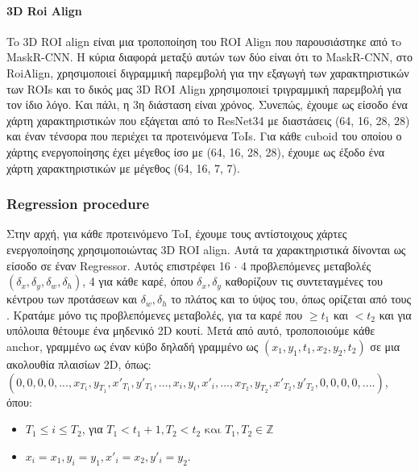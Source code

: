 \paragraph{3D Roi Align}
\en To  \en 3D ROI align \gr είναι μια τροποποίηση του \en ROI Align \gr που παρουσιάστηκε από τo \en MaskR-CNN\gr. Η κύρια διαφορά μεταξύ αυτών των δύο είναι ότι το
\en MaskR-CNN\gr, στο \en RoiAlign\gr,  χρησιμοποιεί διγραμμική παρεμβολή για την εξαγωγή των χαρακτηριστικών των \en ROIs \gr και το δικός μας \en 3D ROI Align \gr χρησιμοποιεί
τριγραμμική παρεμβολή για τον ίδιο λόγο. Και πάλι, η 3η διάσταση είναι χρόνος.
Συνεπώς, έχουμε ως είσοδο ένα χάρτη χαρακτηριστικών που εξάγεται από το \en  ResNet34  \gr με διαστάσεις (64, 16, 28, 28) και έναν τένσορα που περιέχει τα προτεινόμενα \en ToIs\gr.
Για κάθε \en cuboid \gr του οποίου ο χάρτης ενεργοποίησης έχει μέγεθος ίσο με (64, 16, 28, 28), έχουμε ως έξοδο ένα χάρτη χαρακτηριστικών με μέγεθος (64, 16, 7, 7).  \par

\subsubsection{\en Regression procedure}
\gr Στην αρχή, για κάθε προτεινόμενο \en ToI\gr, έχουμε τους αντίστοιχους χάρτες ενεργοποίησης χρησιμοποιώντας \en 3D ROI align\gr. Αυτά τα χαρακτηριστικά δίνονται ως είσοδο σε έναν \en Regressor\gr.
Αυτός επιστρέφει 16 $\cdot$ 4 προβλεπόμενες μεταβολές $(\delta_x,\delta_y, \delta_w,\delta_h)$, 4 για κάθε καρέ, όπου $ \delta_x, \delta_y$ καθορίζουν τις συντεταγμένες του κέντρου των προτάσεων και
$\delta_w, \delta_h$ το πλάτος και το ύψος του, όπως ορίζεται από τους \en\cite{DBLP:journals/corr/GirshickDDM13}\gr.
Κρατάμε μόνο τις προβλεπόμενες μεταβολές, για τα καρέ που $\ge t_1$ και $< t_2$ και για υπόλοιπα θέτουμε ένα μηδενικό \en 2D \gr κουτί. 
Μετά από αυτό, τροποποιούμε κάθε \en anchor\gr, γραμμένο ως έναν κύβο δηλαδή γραμμένο ως $(x_1,y_1,t_1, x_2, y_2, t_2)$ σε μια ακολουθία πλαισίων \en 2D\gr, όπως: \\
$(0,0,0,0, ..., x_{T_1},y_{T_1},x'_{T_1},y'_{T_1}, ... ,x_{i},y_{i},x'_{i}, ..., x_{T_2},y_{T_2},x'_{T_2},y'_{T_2}, 0,0,0,0, ....)$, \\
όπου:
\begin{itemize}
\item $ T_1 \le i \le T_2$, για $T_1 < t_1 + 1,  T_2 < t_2 \text{ και }T_1,T_2 \in \mathbb{Z} $
\item $ x_i = x_1, y_i= y_1, x'_i = x_2, y'_i = y_2 $.
\end{itemize}

